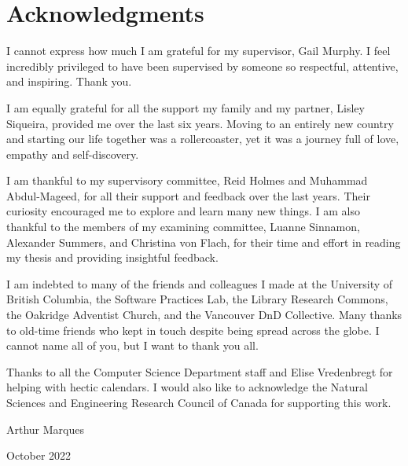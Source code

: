 
\chapter{Acknowledgments}



I cannot express how much I am grateful for my supervisor, Gail Murphy. I feel incredibly privileged to have been supervised by someone so respectful, attentive, and inspiring. Thank you. 

I am equally grateful for all the support my family and my partner, Lisley Siqueira, provided me over the last six years. Moving to an entirely new country and starting our life together was a rollercoaster, yet it was a journey full of love, empathy and self-discovery. 

I am thankful to my supervisory committee, Reid Holmes and Muhammad Abdul-Mageed, for all their support and feedback over the last years. Their curiosity encouraged me to explore and learn many new things. I am also thankful to the members of my examining committee, Luanne Sinnamon, Alexander Summers, and Christina von Flach, for their time and effort in reading my thesis and providing insightful feedback. 

I am indebted to many of the friends and colleagues I made at the University of British Columbia, the Software Practices Lab, the Library Research Commons, the Oakridge Adventist Church, and the Vancouver DnD Collective. Many thanks to old-time friends who kept in touch despite being spread across the globe. I cannot name all of you, but I want to thank you all.


Thanks to all the Computer Science Department staff and Elise Vredenbregt for helping with hectic calendars. I would also like to acknowledge the Natural Sciences and Engineering Research Council of Canada for supporting this work. 


\begin{flushright}
Arthur Marques

October 2022
\end{flushright}


\cleardoublepage


